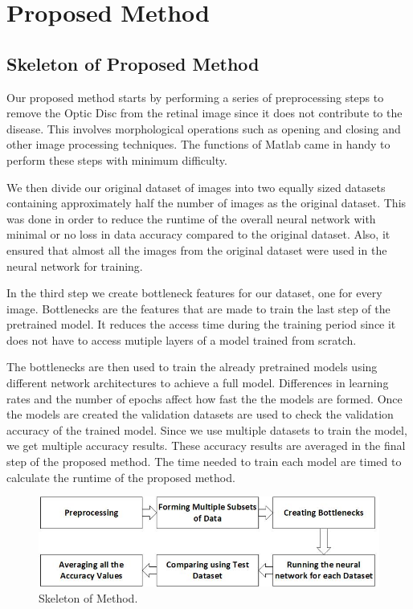 \documentclass[12pt]{report}
\begin{document}
\chapter{Proposed Method}
\vspace{5pt}
\section{Skeleton of Proposed Method}

\noindent Our proposed method starts by performing a series of preprocessing steps to remove the Optic Disc from the retinal image since it does not contribute to the disease. This involves morphological operations such as opening and closing and other image processing techniques. The functions of Matlab came in handy to perform these steps with minimum difficulty. 

\noindent We then divide our original dataset of images into two equally sized datasets containing approximately half the number of images as the original dataset. This was done in order to reduce the runtime of the overall neural network with minimal or no loss in data accuracy compared to the original dataset. Also, it ensured that almost all the images from the original dataset were used in the neural network for training.  

\vspace{13pt}



\noindent In the third step we create bottleneck features for our dataset, one for every image. Bottlenecks are the features that are made to train the last step of the pretrained model. It reduces the access time during the training period since it does not have to access mutiple layers of a model trained from scratch.

\noindent The bottlenecks are then used to train the already pretrained models using different network architectures to achieve a full model. Differences in learning rates and the number of epochs affect how fast the the models are formed. Once the models are created the validation datasets are used to check the validation accuracy of the trained model. Since we use multiple datasets to train the model, we get multiple accuracy results. These accuracy results are averaged in the final step of the proposed method. The time needed to train each model are timed to calculate the runtime of the proposed method.

\begin{figure}[h]
\centering
\includegraphics[width=1\textwidth]{Drawing2}
\caption{Skeleton of Method.}
\label{fig:test3}
\end{figure}
\end{document}
